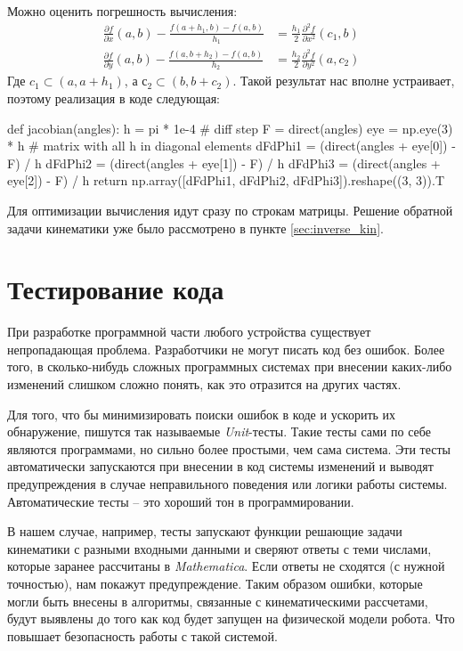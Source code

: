\noindent Можно оценить погрешность вычисления:
\begin{align*}
    \frac{\partial f}{\partial x}(a, b) - \frac{f(a+h_1, b) - f(a, b)}{h_1} &= \frac{h_1}{2} \frac{\partial^2 f}{\partial x^2}(c_1, b) \\ 
    \frac{\partial f}{\partial y}(a, b) - \frac{f(a, b+h_2) - f(a, b)}{h_2} &= \frac{h_2}{2} \frac{\partial^2 f}{\partial y^2}(a, c_2)
\end{align*}
\noindent Где $ c_1 \subset (a, a+h_1) $, а $ с_2 \subset (b, b+c_2) $. Такой результат нас вполне устраивает, поэтому реализация в коде следующая:
\begin{python}
def jacobian(angles):
    h = pi * 1e-4 # diff step
    F = direct(angles)
    eye = np.eye(3) * h # matrix with all h in diagonal elements
    dFdPhi1 = (direct(angles + eye[0]) - F) / h
    dFdPhi2 = (direct(angles + eye[1]) - F) / h
    dFdPhi3 = (direct(angles + eye[2]) - F) / h
    return np.array([dFdPhi1, dFdPhi2, dFdPhi3]).reshape((3, 3)).T
\end{python}

\noindent Для оптимизации вычисления идут сразу по строкам матрицы.
Решение обратной задачи кинематики уже было рассмотрено в пункте \ref{sec:inverse_kin}.

\section{Тестирование кода}

При разработке программной части любого устройства существует непропадающая проблема. Разработчики не могут писать код без ошибок.
Более того, в сколько-нибудь сложных программных системах при внесении каких-либо изменений слишком сложно понять, как это отразится на других частях.

Для того, что бы минимизировать поиски ошибок в коде и ускорить их обнаружение, пишутся так называемые \textit{Unit}-тесты. Такие тесты сами по себе являются программами, но сильно более простыми, чем сама система. Эти тесты автоматически запускаются при внесении в код системы изменений и выводят предупреждения в случае неправильного поведения или логики работы системы.
Автоматические тесты -- это хороший тон в программировании.

В нашем случае, например, тесты запускают функции решающие задачи кинематики с разными входными данными и сверяют ответы с теми числами, которые заранее рассчитаны в \textit{Mathematica}. Если ответы не сходятся (с нужной точностью), нам покажут предупреждение. Таким образом ошибки, которые могли быть внесены в алгоритмы, связанные с кинематическими рассчетами, будут выявлены до того как код будет запущен на физической модели робота. Что повышает безопасность работы с такой системой.

